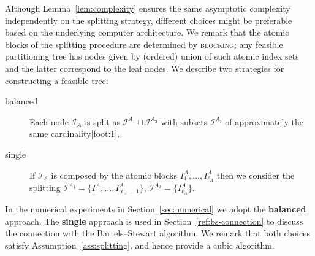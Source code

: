 \documentclass{siamart1116}
\begin{document}
Although Lemma~\ref{lem:complexity} ensures the same asymptotic complexity independently on the splitting strategy, different choices might be preferable based on the underlying computer architecture. We remark that the atomic blocks of the splitting procedure are determined by \textsc{blocking}; any feasible partitioning tree has nodes given by (ordered) union of such atomic index sets and the latter correspond to the leaf nodes.  
We describe two strategies for constructing a feasible tree:

\begin{description}
\item[balanced] Each node $\mathcal I_A$ is split as $\mathcal I^{A_1}\sqcup\mathcal{I}^{A_2}$ with subsets $\mathcal I^{A_i}$ 
of approximately the same cardinality\cref{foot:1}.
\item[single] If $\mathcal I_A$ is composed by the atomic blocks $I^{A}_1,\dots,I^{A}_{\ell_A}$ then we consider the splitting $\mathcal I^{A_1}=\{I^{A}_1,\dots,I^{A}_{\ell_A-1}\}$, $\mathcal{I}^{A_2}=\{ I^{A}_{\ell_A} \}$.
\end{description}
In the numerical experiments in Section~\ref{sec:numerical} we adopt 
the \textbf{balanced} approach. The \textbf{single} approach is used in 
Section~\ref{ref:bs-connection} to discuss the connection with the 
Bartels--Stewart algorithm. We remark that both choices 
satisfy Assumption~\ref{ass:splitting}, and hence provide a cubic 
algorithm. 
\end{document}
